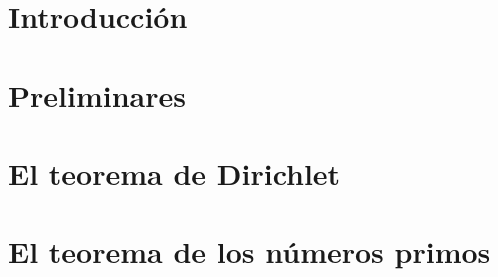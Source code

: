 \documentclass[12pt]{book}
\begin{document}

\setcounter{page}{1}
\chapter*{Introducción}

\blankpages
\chapter{Preliminares}

\blankpages
\chapter{El teorema de Dirichlet}

\blankpages
\chapter{El teorema de los números primos}

\nocite{*}
\blankpages


\end{document}
